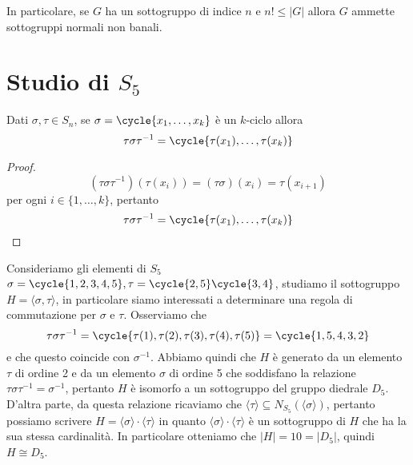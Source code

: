 \documentclass[11pt]{scrartcl}
\begin{document}
\begin{remark}
    In particolare, se $G$ ha un sottogruppo di indice $n$ e $n! \leqslant |G|$
    allora $G$ ammette sottogruppi normali non banali.
\end{remark}

\newpage

\section{Studio di $S_5$}

\begin{lemma}
    Dati $\sigma, \tau \in S_n$, se $\sigma = \cycle{x_1, \ldots, x_k}$ è un 
    $k$-ciclo allora 
    \[
        \tau\sigma\tau^{-1} = \cycle{\tau(x_1),\ldots, \tau(x_k)}
    \]
\end{lemma}

\begin{proof}
    \[
        (\tau\sigma\tau^{-1})(\tau(x_i)) = (\tau\sigma)(x_i) = \tau(x_{i + 1})
    \]per ogni $i \in \{1, \ldots, k\}$, pertanto
    \[
        \tau\sigma\tau^{-1} = \cycle{\tau(x_1), \ldots, \tau(x_k)}
    \]
\end{proof}

Consideriamo gli elementi di $S_5$ $\sigma = \cycle{1, 2, 3, 4, 5}, 
\tau = \cycle{2, 5}\cycle{3, 4}$, studiamo il sottogruppo $H = \langle\sigma, \tau\rangle$,
in particolare siamo interessati a determinare una regola di commutazione
per $\sigma$ e $\tau$. Osserviamo che 
\[
    \tau\sigma\tau^{-1} = \cycle{\tau(1), \tau(2), \tau(3), \tau(4), \tau(5)} = 
    \cycle{1, 5, 4, 3, 2}
\]
e che questo coincide con $\sigma^{-1}$. Abbiamo quindi che $H$ è generato 
da un elemento $\tau$ di ordine 2 e da un elemento $\sigma$ di ordine 5 
che soddisfano la relazione $\tau\sigma\tau^{-1} = \sigma^{-1}$, pertanto 
$H$ è isomorfo a un sottogruppo del gruppo diedrale $D_5$. D'altra parte, 
da questa relazione ricaviamo che $\langle \tau\rangle \subseteq N_{S_5}(\langle\sigma\rangle)$,
pertanto possiamo scrivere $H = \langle\sigma\rangle\cdot\langle\tau\rangle$
in quanto $\langle\sigma\rangle\cdot\langle\tau\rangle$ è un sottogruppo di $H$
che ha la sua stessa cardinalità. In particolare otteniamo che $|H| = 10 = |D_5|$,
quindi $H \cong D_5$.
\end{document}
